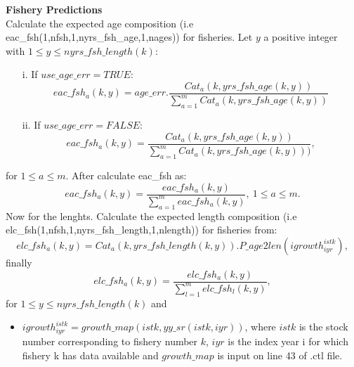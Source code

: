 \documentclass{article}
\begin{document}
\textbf{Fishery Predictions}\\
Calculate the expected age composition (i.e eac\_fsh(1,nfsh,1,nyrs\_fsh\_age,1,nages)) for fisheries. Let $y$ a positive integer with $1\leq y \leq nyrs\_fsh\_length(k)$:
\begin{itemize}
\item [i.] If $use\_age\_err=TRUE$:
    \begin{equation}
    eac\_fsh_a(k,y)=age\_err.\dfrac{Cat_a(k,yrs\_fsh\_age(k,y))}{\displaystyle\sum_{a=1}^mCat_a(k,yrs\_fsh\_age(k,y))}
\end{equation}
\item [ii.] If $use\_age\_err=FALSE$:
\begin{equation}
    eac\_fsh_a(k,y)=\dfrac{Cat_a(k,yrs\_fsh\_age(k,y))}{\displaystyle\sum_{a=1}^mCat_a(k,yrs\_fsh\_age(k,y)))},
\end{equation}
\end{itemize}
for $1\leq a \leq m$.
After calculate eac\_fsh as:
\begin{equation}
    eac\_fsh_a(k,y)=\dfrac{eac\_fsh_a(k,y)}{\displaystyle\sum_{a=1}^meac\_fsh_a(k,y)}, \ 1\leq a \leq m.
\end{equation}
Now for the lenghts. Calculate the expected length composition (i.e elc\_fsh(1,nfsh,1,nyrs\_fsh\_length,1,nlength)) for fisheries from: 
\begin{equation}
elc\_fsh_a(k,y)=Cat_a(k,yrs\_fsh\_length(k,y)).P\_age2len(igrowth^{istk}_{iyr}),
\end{equation}
finally
\begin{equation}
elc\_fsh_a(k,y)=\dfrac{elc\_fsh_a(k,y)}{\displaystyle\sum_{l=1}^melc\_fsh_l(k,y)},
\end{equation}
for $1\leq y \leq nyrs\_fsh\_length(k)$ and \\
\begin{itemize}
    \item $igrowth^{istk}_{iyr}=growth\_map(istk,yy\_sr(istk,iyr))$, where $istk$ is the stock number corresponding to fishery number $k$, $iyr$ is the index year i for which fishery k has data available and $growth\_map$ is input on line 43 of .ctl file.
\end{itemize}
\end{document}
